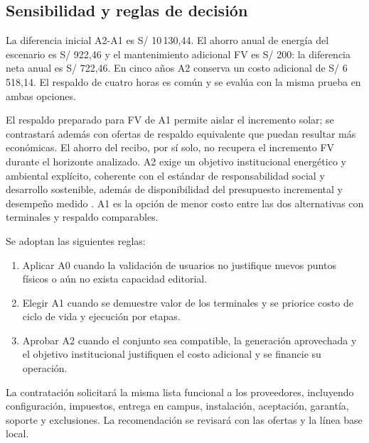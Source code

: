 \subsection{Sensibilidad y reglas de decisión}
La diferencia inicial A2-A1 es S/ 10\,130,44. El ahorro anual de energía del escenario es S/ 922,46 y el mantenimiento adicional FV es S/ 200: la diferencia neta anual es S/ 722,46. En cinco años A2 conserva un costo adicional de S/ 6\,518,14. El respaldo de cuatro horas es común y se evalúa con la misma prueba en ambas opciones.

El respaldo preparado para FV de A1 permite aislar el incremento solar; se contrastará además con ofertas de respaldo equivalente que puedan resultar más económicas. El ahorro del recibo, por sí solo, no recupera el incremento FV durante el horizonte analizado. A2 exige un objetivo institucional energético y ambiental explícito, coherente con el estándar de responsabilidad social y desarrollo sostenible, además de disponibilidad del presupuesto incremental y desempeño medido \cite{sineace2025}. A1 es la opción de menor costo entre las dos alternativas con terminales y respaldo comparables.

Se adoptan las siguientes reglas:
\begin{enumerate}
\item Aplicar A0 cuando la validación de usuarios no justifique nuevos puntos físicos o aún no exista capacidad editorial.
\item Elegir A1 cuando se demuestre valor de los terminales y se priorice costo de ciclo de vida y ejecución por etapas.
\item Aprobar A2 cuando el conjunto sea compatible, la generación aprovechada y el objetivo institucional justifiquen el costo adicional y se financie su operación.
\end{enumerate}
La contratación solicitará la misma lista funcional a los proveedores, incluyendo configuración, impuestos, entrega en campus, instalación, aceptación, garantía, soporte y exclusiones. La recomendación se revisará con las ofertas y la línea base local.


